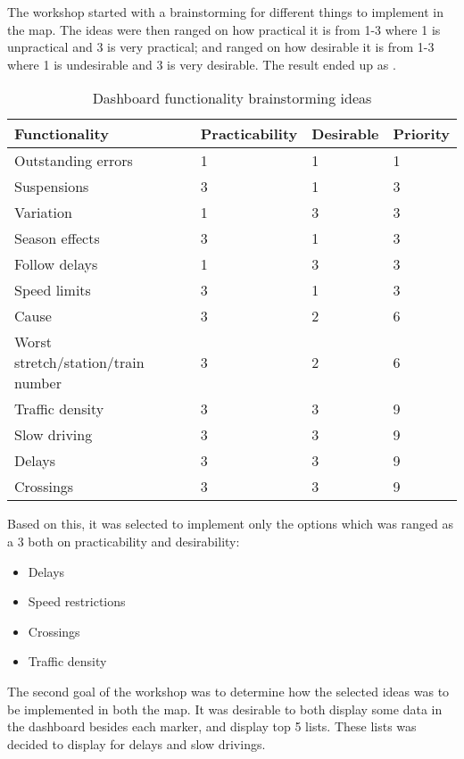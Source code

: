 The workshop started with a brainstorming for different things to implement in
the map. The ideas were then ranged on how practical it is from 1-3 where 1 is
unpractical and 3 is very practical; and ranged on how desirable it is from 1-3
where 1 is undesirable and 3 is very desirable. The result ended up as .

\begin{table}[!h]\small
	\begin{tabularx}{\textwidth}{|X|l|l|l|}
		\hline
		Functionality & Practicability & Desirable & Priority\\
		\hline
		Outstanding errors & 1 & 1 & 1\\
		\hline
		Suspensions & 3 & 1 & 3\\
		\hline
		Variation & 1 & 3 & 3\\
		\hline
		Season effects & 3 & 1 & 3\\
		\hline
		Follow delays & 1 & 3 & 3\\
		\hline
		Speed limits & 3 & 1 & 3\\
		\hline
		Cause & 3 & 2 & 6\\
		\hline
	 	Worst stretch/station/train number & 3 & 2 & 6\\
		\hline
		Traffic density & 3 & 3 & 9\\
		\hline
		Slow driving & 3 & 3 & 9\\
		\hline
		Delays & 3 & 3 & 9\\
		\hline
		Crossings & 3 & 3 & 9\\
		\hline
	\end{tabularx}
\caption{Dashboard functionality brainstorming ideas}
\label{table:dashboard_functionality_wants_vs_needs}
\end{table}

Based on this, it was selected to implement only the options which was ranged
as a 3 both on practicability and desirability:

\begin{itemize}
  \item Delays
  \item Speed restrictions
  \item Crossings
  \item Traffic density
\end{itemize}

The second goal of the workshop was to determine how the selected ideas was to
be implemented in both the map. It was desirable to both display some data in
the dashboard besides each marker, and display top 5 lists. These lists was
decided to display for delays and slow drivings. 

